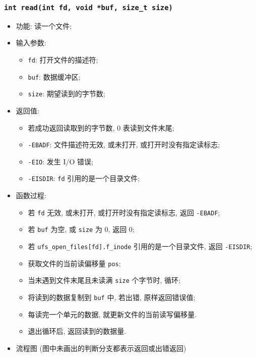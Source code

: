 \documentclass[nofonts]{ctexart}
\begin{document}
  \subsubsection{\texttt{int read(int fd, void *buf, size\_t size)}}
  \begin{itemize}
\item
  功能: 读一个文件;
\item
  输入参数:

  \begin{itemize}
  \item
    \texttt{fd}: 打开文件的描述符;
  \item
    \texttt{buf}: 数据缓冲区;
  \item
    \texttt{size}: 期望读到的字节数;
  \end{itemize}
\item
  返回值:

  \begin{itemize}
  \item
    若成功返回读取到的字节数, 0 表读到文件末尾;
  \item
    \texttt{-EBADF}: 文件描述符无效, 或未打开, 或打开时没有指定读标志;
  \item
    \texttt{-EIO}: 发生 I/O 错误;
  \item
    \texttt{-EISDIR}: \texttt{fd} 引用的是一个目录文件;
  \end{itemize}
\item
  函数过程:

  \begin{itemize}
  \item
    若 \texttt{fd} 无效, 或未打开, 或打开时没有指定读标志, 返回
    \texttt{-EBADF};
  \item
    若 \texttt{buf} 为空, 或 \texttt{size} 为 0, 返回 0;
  \item
    若 \texttt{ufs\_open\_files{[}fd{]}.f\_inode} 引用的是一个目录文件,
    返回 \texttt{-EISDIR};
  \item
    获取文件的当前读偏移量 \texttt{pos};
  \item
    当未遇到文件末尾且未读满 \texttt{size} 个字节时, 循环;
  \item
    将读到的数据复制到 \texttt{buf} 中, 若出错, 原样返回错误值;
  \item
    每读完一个单元的数据, 就更新文件的当前读写偏移量.
  \item
    退出循环后, 返回读到的数据量.
  \end{itemize}
\item
  流程图
  (图中未画出的判断分支都表示返回或出错返回)


\end{itemize}
\end{document}
